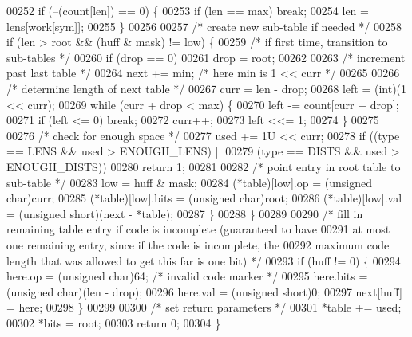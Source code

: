 \begin{DoxyCode}
00252         \textcolor{keywordflow}{if} (--(count[len]) == 0) \{
00253             \textcolor{keywordflow}{if} (len == max) \textcolor{keywordflow}{break};
00254             len = lens[work[sym]];
00255         \}
00256 
00257         \textcolor{comment}{/* create new sub-table if needed */}
00258         \textcolor{keywordflow}{if} (len > root && (huff & mask) != low) \{
00259             \textcolor{comment}{/* if first time, transition to sub-tables */}
00260             \textcolor{keywordflow}{if} (drop == 0)
00261                 drop = root;
00262 
00263             \textcolor{comment}{/* increment past last table */}
00264             next += min;            \textcolor{comment}{/* here min is 1 << curr */}
00265 
00266             \textcolor{comment}{/* determine length of next table */}
00267             curr = len - drop;
00268             left = (int)(1 << curr);
00269             \textcolor{keywordflow}{while} (curr + drop < max) \{
00270                 left -= count[curr + drop];
00271                 \textcolor{keywordflow}{if} (left <= 0) \textcolor{keywordflow}{break};
00272                 curr++;
00273                 left <<= 1;
00274             \}
00275 
00276             \textcolor{comment}{/* check for enough space */}
00277             used += 1U << curr;
00278             \textcolor{keywordflow}{if} ((type == LENS && used > ENOUGH\_LENS) ||
00279                 (type == DISTS && used > ENOUGH\_DISTS))
00280                 \textcolor{keywordflow}{return} 1;
00281 
00282             \textcolor{comment}{/* point entry in root table to sub-table */}
00283             low = huff & mask;
00284             (*table)[low].op = (\textcolor{keywordtype}{unsigned} char)curr;
00285             (*table)[low].bits = (\textcolor{keywordtype}{unsigned} char)root;
00286             (*table)[low].val = (\textcolor{keywordtype}{unsigned} short)(next - *table);
00287         \}
00288     \}
00289 
00290     \textcolor{comment}{/* fill in remaining table entry if code is incomplete (guaranteed to have}
00291 \textcolor{comment}{       at most one remaining entry, since if the code is incomplete, the}
00292 \textcolor{comment}{       maximum code length that was allowed to get this far is one bit) */}
00293     \textcolor{keywordflow}{if} (huff != 0) \{
00294         here.op = (\textcolor{keywordtype}{unsigned} char)64;            \textcolor{comment}{/* invalid code marker */}
00295         here.bits = (\textcolor{keywordtype}{unsigned} char)(len - drop);
00296         here.val = (\textcolor{keywordtype}{unsigned} short)0;
00297         next[huff] = here;
00298     \}
00299 
00300     \textcolor{comment}{/* set return parameters */}
00301     *table += used;
00302     *bits = root;
00303     \textcolor{keywordflow}{return} 0;
00304 \}
\end{DoxyCode}
